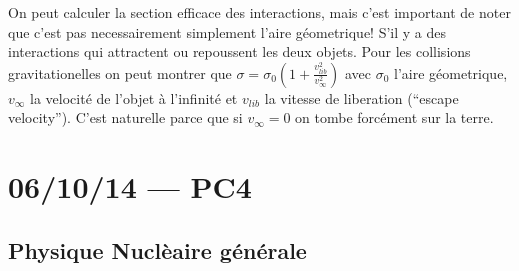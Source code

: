 \documentclass[10pt]{report}
\begin{document}
On peut calculer la section efficace des interactions, mais c'est important de noter que c'est pas necessairement simplement l'aire g\'eometrique! S'il y a des interactions qui attractent ou repoussent les deux objets. Pour les collisions gravitationelles on peut montrer que $\sigma = \sigma_0\left( 1 + \frac{v_{lib}^2}{v_{\infty}^2} \right)$ avec $\sigma_0$ l'aire g\'eometrique, $v_{\infty}$ la velocit\'e de l'objet \`a l'infinit\'e et $v_{lib}$ la vitesse de liberation (``escape velocity''). C'est naturelle parce que si $v_{\infty} = 0$ on tombe forc\'ement sur la terre.
\chapter{06/10/14 --- PC4}

\section{Physique Nucl\`eaire g\'en\'erale}
\end{document}
